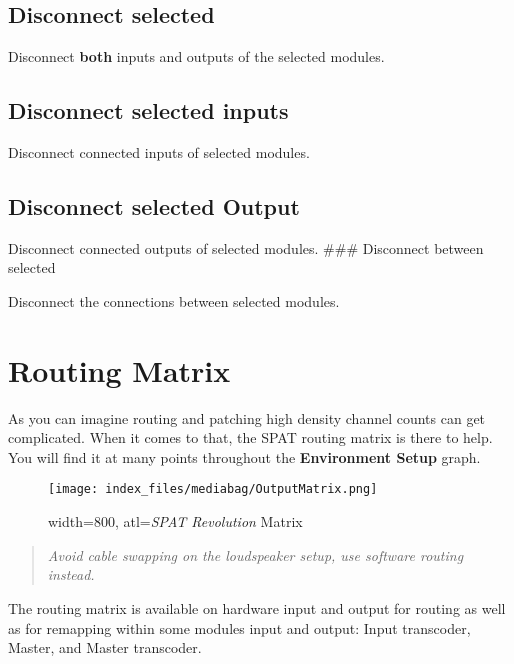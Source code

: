 \documentclass[
  letterpaper,
  DIV=11,
  numbers=noendperiod]{scrreport}
\begin{document}
\hypertarget{disconnect-selected}{%
\subsection{Disconnect selected}\label{disconnect-selected}}

Disconnect \textbf{both} inputs and outputs of the selected modules.

\hypertarget{disconnect-selected-inputs}{%
\subsection{Disconnect selected
inputs}\label{disconnect-selected-inputs}}

Disconnect connected inputs of selected modules.

\hypertarget{disconnect-selected-output}{%
\subsection{Disconnect selected
Output}\label{disconnect-selected-output}}

Disconnect connected outputs of selected modules. \#\#\# Disconnect
between selected

Disconnect the connections between selected modules.

\hypertarget{routing-matrix}{%
\section{Routing Matrix}\label{routing-matrix}}

As you can imagine routing and patching high density channel counts can
get complicated. When it comes to that, the SPAT routing matrix is there
to help. You will find it at many points throughout the
\textbf{Environment Setup} graph.

\begin{figure}

{\centering \texttt{[image: index\_files/mediabag/OutputMatrix.png]}

}

\caption{width=800, atl=\emph{SPAT Revolution} Matrix}

\end{figure}

\begin{quote}
\emph{Avoid cable swapping on the loudspeaker setup, use software
routing instead.}
\end{quote}

The routing matrix is available on hardware input and output for routing
as well as for remapping within some modules input and output: Input
transcoder, Master, and Master transcoder.
\end{document}
